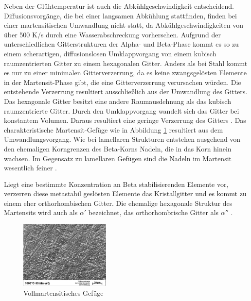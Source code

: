\documentclass[a4paper, 11pt]{tubsreprt}
\begin{document}
Neben der Glühtemperatur ist auch die Abkühlgeschwindigkeit entscheidend. Diffusionsvorgänge, die bei einer langsamen Abkühlung stattfinden, finden bei einer martensitischen Umwandlung nicht statt, da Abkühlgeschwindigkeiten von über 500 K/s durch eine Wasserabschreckung vorherschen. Aufgrund der unterschiedlichen Gitterstrukturen der Alpha- und Beta-Phase kommt es so zu einem scherartigen, diffusionslosen Umklappvorgang von einem kubisch raumzentrierten Gitter zu einem hexagonalen Gitter. Anders als bei Stahl kommt es nur zu einer minimalen Gitterverzerrung, da es keine zwangsgelösten Elemente in der Martensit-Phase gibt, die eine Gitterverzerrung verursachen würden. Die entstehende Verzerrung resultiert ausschließlich aus der Umwandlung des Gitters. Das hexagonale Gitter besitzt eine andere Raumausdehnung als das kubisch raumzentrierte Gitter. Durch den Umklappvorgang wandelt sich das Gitter bei konstantem Volumen. Daraus resultiert eine geringe Verzerrung des Gitters \cite{Luetjering2007}. Das charakteristische Martensit-Gefüge wie in Abbildung \ref{vollmartensit} resultiert aus dem Umwandlungsvorgang. Wie bei lamellaren Strukturen entstehen ausgehend von den ehemaligen Korngrenzen des Beta-Korns Nadeln, die in das Korn hinein wachsen. Im Gegensatz zu lamellaren Gefügen sind die Nadeln im Martensit wesentlich feiner \cite{Luetjering2007}.

Liegt eine bestimmte Konzentration an Beta stabilisierenden Elemente vor, verzerren diese metastabil geslösten Elemente das Kristallgitter und es kommt zu einem eher orthorhombischen Gitter. Die ehemalige hexagonale Struktur des Martensits wird auch als $\alpha'$ bezeichnet, das orthorhombrische Gitter als $\alpha''$ \cite{Luetjering2007}. 

\begin{figure}
\centering
\includegraphics[width=0.4\textwidth]{Bilder/Vollmartensit.jpg}
\caption{Vollmartensitisches Gefüge}
\label{vollmartensit}
\end{figure}
\end{document}
